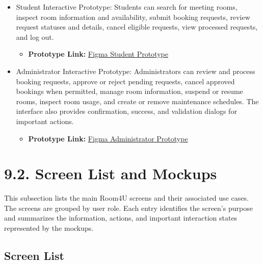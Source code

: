 \begin{itemize}
\item
  Student Interactive Prototype: Students can search for meeting rooms,
  inspect room information and availability, submit booking requests,
  review request statuses and details, cancel eligible requests, view
  processed requests, and log out.

  \begin{itemize}
  \item
    \textbf{Prototype Link:}
    \href{https://www.figma.com/proto/0kLDFGO5txhnNfoH99CaKa/Room4U---Version-3?node-id=7-4}{Figma Student Prototype}
  \end{itemize}
\item
  Administrator Interactive Prototype: Administrators can review and
  process booking requests, approve or reject pending requests, cancel
  approved bookings when permitted, manage room information, suspend or
  resume rooms, inspect room usage, and create or remove maintenance
  schedules. The interface also provides confirmation, success, and
  validation dialogs for important actions.

  \begin{itemize}
  \item
    \textbf{Prototype Link:}
    \href{https://www.figma.com/proto/0kLDFGO5txhnNfoH99CaKa/Room4U---Version-3?node-id=51-239}{Figma Administrator Prototype}
  \end{itemize}
\end{itemize}

\section*{9.2. Screen List and Mockups}\label{screen-list-and-mockups}

This subsection lists the main Room4U screens and their associated use
cases. The screens are grouped by user role. Each entry identifies the
screen's purpose and summarizes the information,
actions, and important interaction states represented by the mockups.

\subsection*{Screen List}
\label{screen-list}

